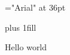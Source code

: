 



\pageheight 9in
\pagewidth 16in
\vsize 9in
\hsize 16in
\voffset -1in
\hoffset -1in

\pagecolor{black}
\color{white}

\font\thirtysixsans="Arial" at 36pt \thirtysixsans

\topglue 0pt plus 1fill
\centerline{Hello world}
\bye
